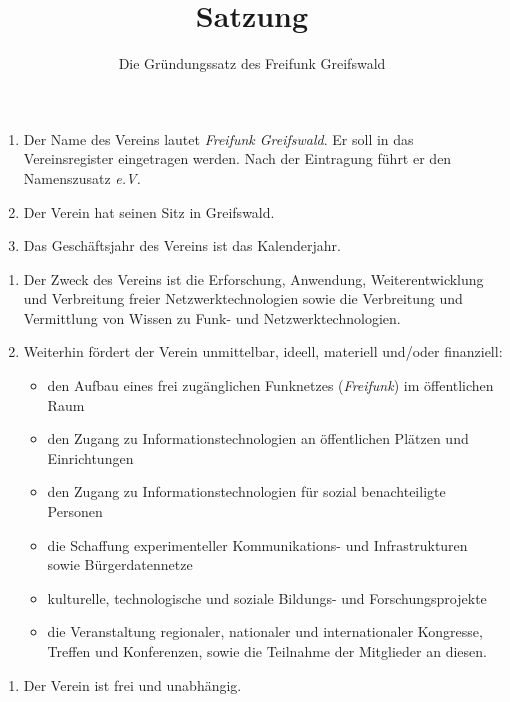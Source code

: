 \documentclass[parskip=half]{scrartcl}
\begin{document}
	\title{Satzung} 
	\author{Die Gründungssatz des Freifunk Greifswald}
	\date{}
	\maketitle
	\begin{contract}
		\begin{enumerate}
			\item Der Name des Vereins lautet \textit{Freifunk Greifswald}. Er soll in das Vereinsregister eingetragen werden. Nach der Eintragung führt er den Namenszusatz \textit{e.V.}
			\item Der Verein hat seinen Sitz in Greifswald.
			\item Das Geschäftsjahr des Vereins ist das Kalenderjahr.
		\end{enumerate}
		\begin{enumerate}
			\item Der Zweck des Vereins ist die Erforschung, Anwendung, Weiterentwicklung und Verbreitung freier Netzwerktechnologien sowie die Verbreitung und Vermittlung von Wissen zu Funk- und Netzwerktechnologien.
			\item Weiterhin fördert der Verein unmittelbar, ideell, materiell und/oder finanziell:
			\begin{itemize}
				\item den Aufbau eines frei zugänglichen Funknetzes (\textit{Freifunk}) im öffentlichen Raum
				\item den Zugang zu Informationstechnologien an öffentlichen Plätzen und Einrichtungen
				\item den Zugang zu Informationstechnologien für sozial benachteiligte Personen
				\item die Schaffung experimenteller Kommunikations- und Infrastrukturen sowie Bürgerdatennetze
				\item kulturelle, technologische und soziale Bildungs- und Forschungsprojekte
				\item die Veranstaltung regionaler, nationaler und internationaler Kongresse, Treffen und Konferenzen, sowie die Teilnahme der Mitglieder an diesen.
			\end{itemize}
		\end{enumerate}
		\begin{enumerate}
			\item Der Verein ist frei und unabhängig.

\end{enumerate}
\end{contract}
\end{document}
